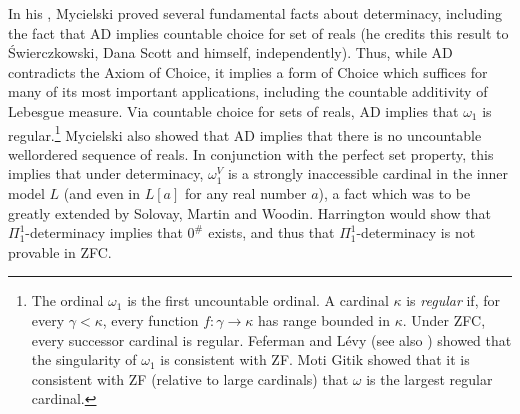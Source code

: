\documentclass{book}%
\begin{document}
In his , Mycielski proved several fundamental facts
about determinacy, including the fact that AD implies countable
choice for set of reals (he credits this result to \'{S}wierczkowski, Dana Scott and himself, independently).
Thus, while AD contradicts the Axiom of Choice, it
implies a form of Choice which suffices for many of its most
important applications, including the countable additivity of Lebesgue measure. Via countable choice for
sets of reals, AD implies that $\omega_{1}$ is regular.\footnote{The ordinal
$\omega_{1}$ is the first uncountable ordinal. A
cardinal $\kappa$ is \emph{regular} if, for
every $\gamma < \kappa$, every function $f \colon \gamma \to \kappa$
has range bounded in $\kappa$. Under ZFC, every successor cardinal
is regular. Feferman and L\'{e}vy  (see also \cite[pp.~153-154]{HowardRubin})
showed that the singularity of $\omega_{1}$ is
consistent with ZF. Moti Gitik  showed that
it is consistent with ZF (relative to large cardinals) that
$\omega$ is the largest regular cardinal.} Mycielski also showed
that AD implies that there is no uncountable wellordered sequence of
reals. In conjunction with the perfect set property, this implies that under
determinacy, $\omega_{1}^{V}$ is a strongly inaccessible
cardinal in the inner model
$L$ (and even in $L[a]$ for any real number
$a$), a fact which was to be greatly extended by
Solovay, Martin and Woodin. Harrington  would
show that $\Pi^{1}_{1}$-determinacy implies that $0^{\#}$ exists,
and thus that $\Pi^{1}_{1}$-determinacy is not
provable in ZFC.
\end{document}
